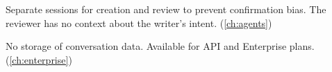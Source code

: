 \begin{description}[style=nextline, leftmargin=2cm]
  \item[Writer/Reviewer pattern]
    Separate sessions for creation and review to prevent confirmation bias.
    The reviewer has no context about the writer's intent. (\cref{ch:agents})

  \item[Zero Data Retention (ZDR)]
    No storage of conversation data. Available for API and Enterprise plans.
    (\cref{ch:enterprise})

\end{description}

